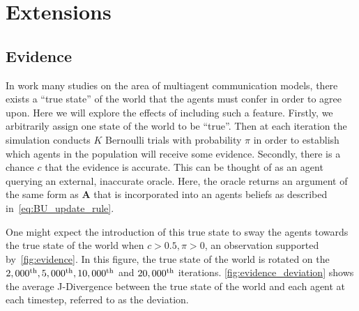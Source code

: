 \section{Extensions}

\subsection{Evidence} \label{sect:evidence}

In work many studies on the area of multiagent communication models, there exists a ``true state'' of the world that the agents must confer in order to agree upon. Here we will explore the effects of including such a feature. Firstly, we arbitrarily assign one state of the world to be ``true''. Then at each iteration the simulation conducts $K$ Bernoulli trials with probability $\pi$ in order to establish which agents in the population will receive some evidence. Secondly, there is a chance $c$ that the evidence is accurate. This can be thought of as an agent querying an external, inaccurate oracle. Here, the oracle returns an argument of the same form as $\mathbf{A}$ that is incorporated into an agents beliefs as described in~\cref{eq:BU_update_rule}. 

One might expect the introduction of this true state to sway the agents towards the true state of the world when $c > 0.5, \pi > 0$, an observation supported by~\cref{fig:evidence}. In this figure, the true state of the world is rotated on the $2,000^{\textnormal{th}},5,000^{\textnormal{th}},10,000^{\textnormal{th}} $ and $ 20,000^{\textnormal{th}}$ iterations. \cref{fig:evidence_deviation} shows the average J-Divergence between the true state of the world and each agent at each timestep, referred to as the deviation. 


